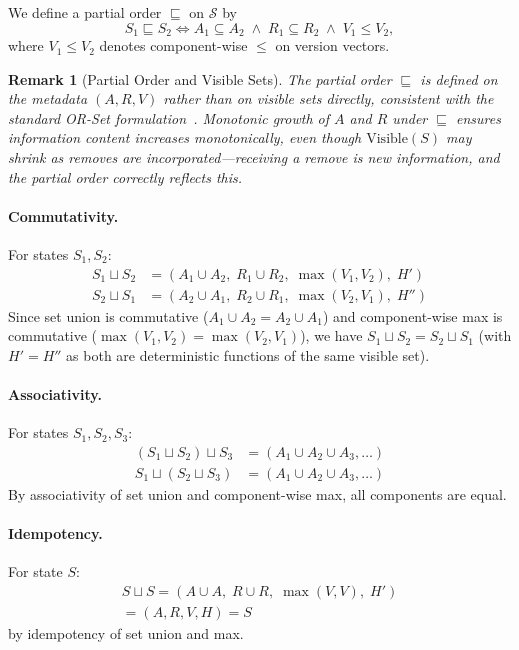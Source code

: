 \documentclass[10pt,letterpaper]{article}
\newtheorem{remark}[theorem]{Remark}
\begin{document}
We define a partial order $\sqsubseteq$ on $\mathcal{S}$ by
\begin{equation}\label{eq:partial}
S_1 \sqsubseteq S_2 \iff A_1 \subseteq A_2 \;\wedge\; R_1 \subseteq R_2 \;\wedge\; V_1 \leq V_2,
\end{equation}
where $V_1 \leq V_2$ denotes component-wise $\leq$ on version vectors.

\begin{remark}[Partial Order and Visible Sets]\label{rem:partial}
The partial order $\sqsubseteq$ is defined on the metadata $(A,R,V)$ rather than on visible sets directly, consistent with the standard OR-Set formulation~\cite{shapiro2011conflict, shapiro2011comprehensive}.
Monotonic growth of $A$ and $R$ under $\sqsubseteq$ ensures information content increases monotonically, even though $\mathrm{Visible}(S)$ may shrink as removes are incorporated---receiving a remove is new information, and the partial order correctly reflects this.
\end{remark}

\paragraph{Commutativity.}
For states $S_1, S_2$:
\begin{align}
S_1 \sqcup S_2 &= (A_1 \cup A_2,\; R_1 \cup R_2,\; \max(V_1,V_2),\; H') \label{eq:comm_1}\\
S_2 \sqcup S_1 &= (A_2 \cup A_1,\; R_2 \cup R_1,\; \max(V_2,V_1),\; H'') \label{eq:comm_2}
\end{align}
Since set union is commutative ($A_1 \cup A_2 = A_2 \cup A_1$) and component-wise max is commutative ($\max(V_1,V_2) = \max(V_2,V_1)$), we have $S_1 \sqcup S_2 = S_2 \sqcup S_1$ (with $H' = H''$ as both are deterministic functions of the same visible set).

\paragraph{Associativity.}
For states $S_1, S_2, S_3$:
\begin{align}
(S_1 \!\sqcup\! S_2) \!\sqcup\! S_3 &= (A_1 \!\cup\! A_2 \!\cup\! A_3, \ldots) \label{eq:assoc_1}\\
S_1 \!\sqcup\! (S_2 \!\sqcup\! S_3) &= (A_1 \!\cup\! A_2 \!\cup\! A_3, \ldots) \label{eq:assoc_2}
\end{align}
By associativity of set union and component-wise max, all components are equal.

\paragraph{Idempotency.}
For state $S$:
\begin{multline}\label{eq:idemp_proof}
S \sqcup S = (A \cup A,\; R \cup R,\; \max(V,V),\; H') \\
= (A, R, V, H) = S
\end{multline}
by idempotency of set union and max.
\end{document}
